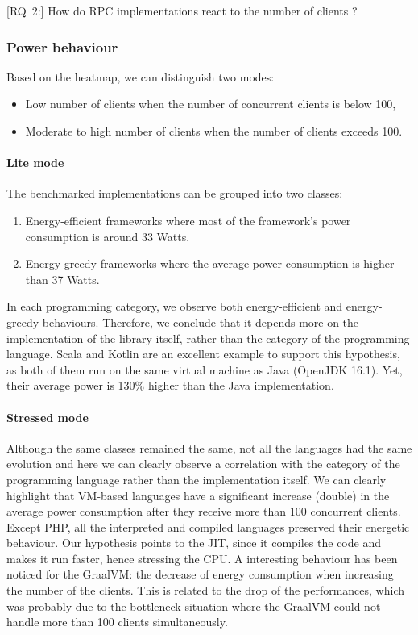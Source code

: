 [\textsc{RQ}~2:] How do RPC implementations react to the number of clients ?

\subsubsection{Power behaviour}
Based on the heatmap, we can distinguish two modes:
\begin{itemize}
    \item \textsf{Low number of clients} when the number of concurrent clients is below 100,
    \item \textsf{Moderate to high number of clients} when the number of clients exceeds 100.
\end{itemize}


\paragraph{Lite mode}
The benchmarked implementations can be grouped into two classes:
\begin{enumerate}
    \item \textsf{Energy-efficient frameworks} where most of the framework's power consumption is around 33 Watts.
    \item \textsf{Energy-greedy frameworks} where the average power consumption is higher than 37 Watts.
\end{enumerate}

In each programming category, we observe both energy-efficient and energy-greedy behaviours.
Therefore, we conclude that it depends more on the implementation of the library itself, rather than the category of the programming language.
Scala and Kotlin are an excellent example to support this hypothesis, as both of them run on the same virtual machine as Java (OpenJDK 16.1).
Yet, their average power is 130\% higher than the Java implementation.

\paragraph{Stressed mode}
Although the same classes remained the same, not all the languages had the same evolution and here we can clearly observe a correlation with the category of the programming language rather than the implementation itself.
We can clearly highlight that VM-based languages have a significant increase (double) in the average power consumption after they receive more than 100 concurrent clients.
Except PHP, all the interpreted and compiled languages preserved their energetic behaviour.
Our hypothesis points to the JIT, since it compiles the code and makes it run faster, hence stressing the CPU.
A interesting behaviour has been noticed for the GraalVM: the decrease of energy consumption when increasing the number of the clients.
This is related to the drop of the performances, which was probably due to the bottleneck situation where the GraalVM could not handle more than 100 clients simultaneously.

